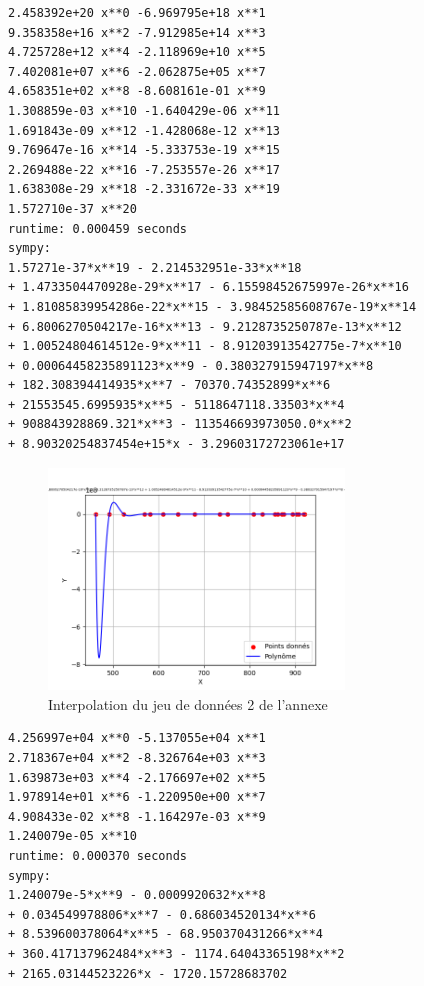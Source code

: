 \begin{lstlisting}[caption=res42.err, basicstyle=\fontsize{8}{10}\selectfont]
2.458392e+20 x**0 -6.969795e+18 x**1 
9.358358e+16 x**2 -7.912985e+14 x**3 
4.725728e+12 x**4 -2.118969e+10 x**5 
7.402081e+07 x**6 -2.062875e+05 x**7 
4.658351e+02 x**8 -8.608161e-01 x**9 
1.308859e-03 x**10 -1.640429e-06 x**11 
1.691843e-09 x**12 -1.428068e-12 x**13 
9.769647e-16 x**14 -5.333753e-19 x**15 
2.269488e-22 x**16 -7.253557e-26 x**17 
1.638308e-29 x**18 -2.331672e-33 x**19 
1.572710e-37 x**20 
runtime: 0.000459 seconds
sympy:
1.57271e-37*x**19 - 2.214532951e-33*x**18 
+ 1.4733504470928e-29*x**17 - 6.15598452675997e-26*x**16 
+ 1.81085839954286e-22*x**15 - 3.98452585608767e-19*x**14 
+ 6.8006270504217e-16*x**13 - 9.2128735250787e-13*x**12 
+ 1.00524804614512e-9*x**11 - 8.91203913542775e-7*x**10 
+ 0.00064458235891123*x**9 - 0.380327915947197*x**8 
+ 182.308394414935*x**7 - 70370.74352899*x**6 
+ 21553545.6995935*x**5 - 5118647118.33503*x**4 
+ 908843928869.321*x**3 - 113546693973050.0*x**2 
+ 8.90320254837454e+15*x - 3.29603172723061e+17
\end{lstlisting}
\begin{figure}[h]
    \centering
    \includegraphics[width=0.7\textwidth]{sources/max/res42.-fig.png}
    \caption{Interpolation du jeu de données 2 de l'annexe}
\end{figure}
\newpage
\begin{lstlisting}[caption=res43.err, basicstyle=\fontsize{8}{10}\selectfont]
4.256997e+04 x**0 -5.137055e+04 x**1 
2.718367e+04 x**2 -8.326764e+03 x**3 
1.639873e+03 x**4 -2.176697e+02 x**5 
1.978914e+01 x**6 -1.220950e+00 x**7 
4.908433e-02 x**8 -1.164297e-03 x**9 
1.240079e-05 x**10 
runtime: 0.000370 seconds
sympy:
1.240079e-5*x**9 - 0.0009920632*x**8 
+ 0.034549978806*x**7 - 0.686034520134*x**6 
+ 8.539600378064*x**5 - 68.950370431266*x**4 
+ 360.417137962484*x**3 - 1174.64043365198*x**2 
+ 2165.03144523226*x - 1720.15728683702
\end{lstlisting}

